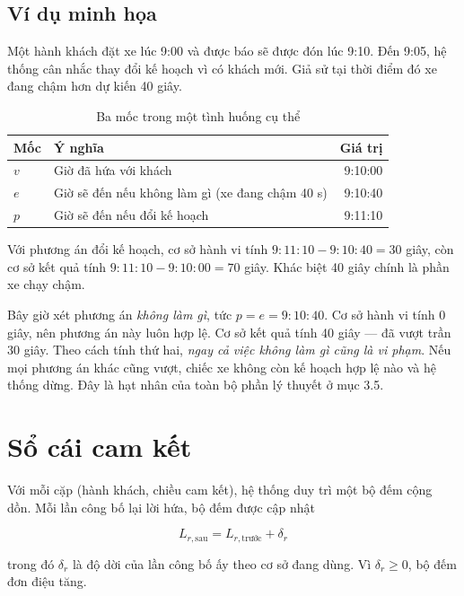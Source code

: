 \subsection{Ví dụ minh họa}

Một hành khách đặt xe lúc 9:00 và được báo sẽ được đón lúc 9:10. Đến 9:05, hệ thống cân nhắc
thay đổi kế hoạch vì có khách mới. Giả sử tại thời điểm đó xe đang chậm hơn dự kiến 40 giây.

\begin{table}[htbp]
\centering
\caption{Ba mốc trong một tình huống cụ thể}
\label{bang:bamoc}
\small
\begin{tabular}{@{}llr@{}}
\toprule
\textbf{Mốc} & \textbf{Ý nghĩa} & \textbf{Giá trị}\\
\midrule
$v$ & Giờ đã hứa với khách & 9:10:00\\
$e$ & Giờ sẽ đến nếu không làm gì (xe đang chậm 40 s) & 9:10:40\\
$p$ & Giờ sẽ đến nếu đổi kế hoạch & 9:11:10\\
\bottomrule
\end{tabular}
\end{table}

Với phương án đổi kế hoạch, cơ sở hành vi tính $9{:}11{:}10 - 9{:}10{:}40 = 30$ giây, còn cơ sở
kết quả tính $9{:}11{:}10 - 9{:}10{:}00 = 70$ giây. Khác biệt 40 giây chính là phần xe chạy chậm.

Bây giờ xét phương án \emph{không làm gì}, tức $p = e = 9{:}10{:}40$. Cơ sở hành vi tính 0 giây,
nên phương án này luôn hợp lệ. Cơ sở kết quả tính 40 giây --- đã vượt trần 30 giây. Theo cách
tính thứ hai, \emph{ngay cả việc không làm gì cũng là vi phạm}. Nếu mọi phương án khác cũng vượt,
chiếc xe không còn kế hoạch hợp lệ nào và hệ thống dừng. Đây là hạt nhân của toàn bộ phần lý
thuyết ở mục 3.5.

\section{Sổ cái cam kết}

Với mỗi cặp (hành khách, chiều cam kết), hệ thống duy trì một bộ đếm cộng dồn. Mỗi lần công bố
lại lời hứa, bộ đếm được cập nhật

\begin{equation}
L_{r,\text{sau}} = L_{r,\text{trước}} + \delta_r
\end{equation}

trong đó $\delta_r$ là độ dời của lần công bố ấy theo cơ sở đang dùng. Vì $\delta_r \ge 0$, bộ
đếm đơn điệu tăng.

